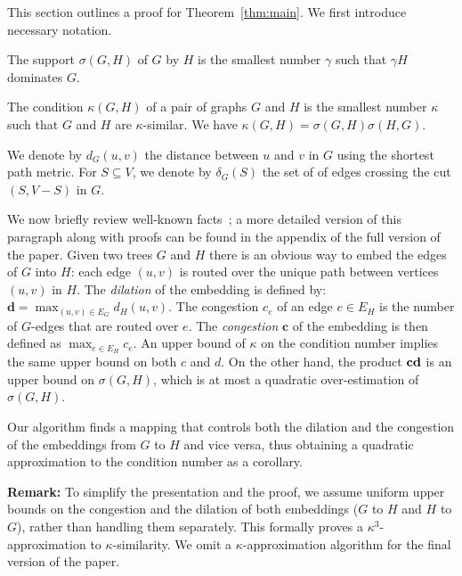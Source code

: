 This section outlines a proof for Theorem~\ref{thm:main}. We first introduce necessary notation. 



\begin{definition}
	The support $\sigma(G,H)$ of $G$ by $H$ is the smallest number 
	$\gamma$ such that $\gamma H$ dominates $G$. 
\end{definition}

\begin{definition}
	The condition $\kappa(G,H)$ of a pair of graphs $G$ and $H$
	is the smallest number $\kappa$ such that $G$ and $H$ are $\kappa$-similar. We have $\kappa(G,H) = \sigma(G,H) \sigma(H,G)$.	
\end{definition}

We denote by $d_G(u,v)$ the distance between $u$ and $v$ in $G$ using
the shortest path metric. For $S\subseteq V$, we denote by
$\delta_G(S)$ the set of of edges crossing the cut $(S,V-S)$
in $G$. 
 

We now briefly review well-known facts~\cite{GuatteryM00};
a more detailed version of this paragraph along with proofs can be
found in the appendix of the full version of the paper. 
Given two trees $G$ and $H$ there is an obvious way to embed
the edges of $G$ into $H$: each edge $(u,v)$ is routed over
the unique path between vertices $(u,v)$ in $H$. The \emph{dilation}
of the embedding is defined by: 
$
     {\mathbf d} = \max_{(u,v)\in E_G} d_H(u,v).
$
The congestion $c_e$ of an edge $e\in E_H$ is the number
of $G$-edges that are routed over $e$. The \emph{congestion} ${\mathbf c}$
of the embedding is then defined as $\max_{e\in E_H} c_e$. 
An upper bound of $\kappa$ on the condition number
implies the same upper bound on both $c$ and $d$. On the other hand, the product $\mathbf c \mathbf d$
is an upper bound on $\sigma(G,H)$, which is at most a quadratic
over-estimation of $\sigma(G,H)$. 


Our algorithm finds a mapping  that controls both the dilation and the congestion of the embeddings from $G$ to $H$ and vice versa, thus obtaining a quadratic approximation to the condition number as a corollary.

\smallskip
\noindent \textbf{Remark:} To simplify the presentation and the proof, we assume uniform upper bounds on the congestion and the dilation of both embeddings ($G$ to $H$ and $H$ to $G$), rather than handling them separately. This formally proves a $\kappa^3$-approximation to $\kappa$-similarity. 
We omit a $\kappa$-approximation algorithm for the final version of the paper. 

